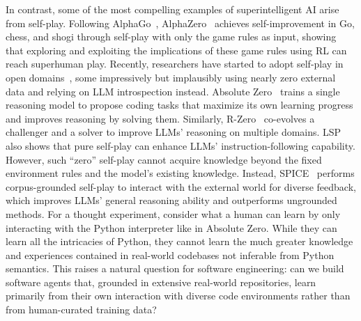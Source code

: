 In contrast, some of the most compelling examples of superintelligent AI arise from self-play.
Following AlphaGo~\cite{silver2016mastering}, AlphaZero~\cite{alphazero} achieves self-improvement in Go, chess, and shogi through self-play with only the game rules as input, showing that exploring and exploiting the implications of these game rules using RL can reach superhuman play.
Recently, researchers have started to adopt self-play in open domains~\cite{zhao2025absolutezeroreinforcedselfplay,
huang2025rzeroselfevolvingreasoningllm,
kuba2025languageselfplaydatafreetraining,
lin2025learningsolveverifyselfplay,
chen2025selfquestioninglanguagemodels,
liu2025rstarcoderscalingcompetitivecode,
haluptzok2023languagemodelsteachprogram}, some impressively but implausibly using nearly zero external data and relying on LLM introspection instead.
Absolute Zero~\cite{zhao2025absolutezeroreinforcedselfplay} trains a single reasoning model to propose coding tasks that maximize its own learning progress and improves reasoning by solving them.
Similarly, R-Zero~\cite{huang2025rzeroselfevolvingreasoningllm} co-evolves a challenger and a solver to improve LLMs' reasoning on multiple domains.
LSP~\cite{kuba2025languageselfplaydatafreetraining} also shows that pure self-play can enhance LLMs' instruction-following capability.
However, such ``zero'' self-play cannot acquire knowledge beyond the fixed environment rules and the model's existing knowledge. Instead, SPICE~\cite{spiceselfplay} performs corpus-grounded self-play to interact with the external world for diverse feedback, which improves LLMs' general reasoning ability and outperforms ungrounded methods. For a thought experiment, consider what a human can learn by only interacting with the Python interpreter like in Absolute Zero.
While they can learn all the intricacies of Python, they cannot learn the much greater knowledge and experiences contained in real-world codebases not inferable from Python semantics.
This raises a natural question for software engineering: can we build software agents that, grounded in extensive real-world repositories, learn primarily from their own interaction with diverse code environments rather than from human-curated training data?

